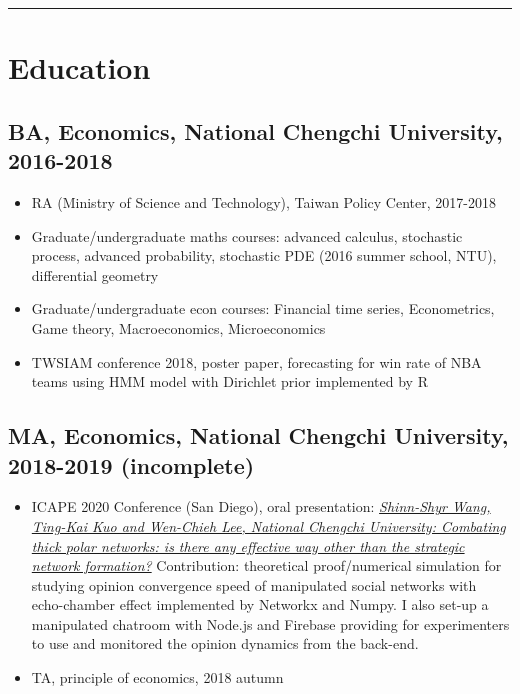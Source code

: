 \documentclass[11pt]{article}
\begin{document}
\begin{multicols*}{2}
\hrule

\columnbreak

\section*{Education}

\subsection*{BA, Economics, National Chengchi University, 2016-2018}

    \begin{itemize}[noitemsep]
        \item RA (Ministry of Science and Technology), Taiwan Policy Center, 2017-2018
        \item Graduate/undergraduate maths courses: advanced calculus, stochastic process, advanced probability, stochastic PDE (2016 summer school, NTU), differential geometry
        \item Graduate/undergraduate econ courses: Financial time series, Econometrics, Game theory, Macroeconomics, Microeconomics
        \item TWSIAM conference 2018, poster paper, forecasting for win rate of NBA teams using HMM model with Dirichlet prior implemented by R
    \end{itemize}


\subsection*{MA, Economics, National Chengchi University, 2018-2019 (incomplete)}

    \begin{itemize}[noitemsep]
        \item ICAPE 2020 Conference (San Diego), oral presentation: \href{https://ah.lib.nccu.edu.tw/item?item_id=163948&locale=en}{\textit{Shinn-Shyr Wang, Ting-Kai Kuo and Wen-Chieh Lee, National Chengchi University: Combating thick polar networks: is there any effective way other than the strategic network formation?}} Contribution: theoretical proof/numerical simulation for studying opinion convergence speed of manipulated social networks with echo-chamber effect implemented by Networkx and Numpy. I also set-up a manipulated chatroom with Node.js and Firebase providing for experimenters to use and monitored the opinion dynamics from the back-end.
        \item TA, principle of economics, 2018 autumn
    

\end{itemize}
\end{multicols*}
\end{document}
